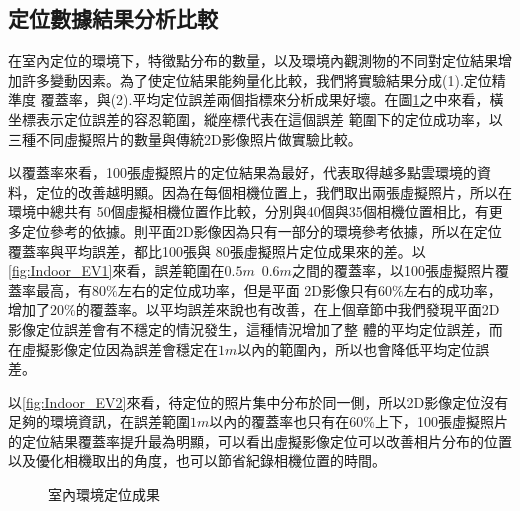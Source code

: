 \subsection{定位數據結果分析比較}

		在室內定位的環境下，特徵點分布的數量，以及環境內觀測物的不同對定位結果增加許多變動因素。為了使定位結果能夠量化比較，我們將實驗結果分成(1).定位精準度
	覆蓋率，與(2).平均定位誤差兩個指標來分析成果好壞。在圖\ref{fig:Indoor_EV_and_Query}之中來看，橫坐標表示定位誤差的容忍範圍，縱座標代表在這個誤差
	範圍下的定位成功率，以三種不同虛擬照片的數量與傳統2D影像照片做實驗比較。
	
		以覆蓋率來看，100張虛擬照片的定位結果為最好，代表取得越多點雲環境的資料，定位的改善越明顯。因為在每個相機位置上，我們取出兩張虛擬照片，所以在環境中總共有
	50個虛擬相機位置作比較，分別與40個與35個相機位置相比，有更多定位參考的依據。則平面2D影像因為只有一部分的環境參考依據，所以在定位覆蓋率與平均誤差，都比100張與
	80張虛擬照片定位成果來的差。以\ref{fig:Indoor_EV1}來看，誤差範圍在$0.5m$~$0.6m$之間的覆蓋率，以100張虛擬照片覆蓋率最高，有$80\%$左右的定位成功率，但是平面
	2D影像只有$60\%$左右的成功率，增加了$20\%$的覆蓋率。以平均誤差來說也有改善，在上個章節中我們發現平面2D影像定位誤差會有不穩定的情況發生，這種情況增加了整
	體的平均定位誤差，而在虛擬影像定位因為誤差會穩定在$1m$以內的範圍內，所以也會降低平均定位誤差。
	
		以\ref{fig:Indoor_EV2}來看，待定位的照片集中分布於同一側，所以2D影像定位沒有足夠的環境資訊，在誤差範圍$1m$以內的覆蓋率也只有在$60\%$上下，100張虛擬照片
	的定位結果覆蓋率提升最為明顯，可以看出虛擬影像定位可以改善相片分布的位置以及優化相機取出的角度，也可以節省紀錄相機位置的時間。
	
	

\begin{figure}
	\begin{center}
	\end{center}
  \caption{室內環境定位成果}
  \label{fig:Indoor_EV_and_Query}	
\end{figure}	